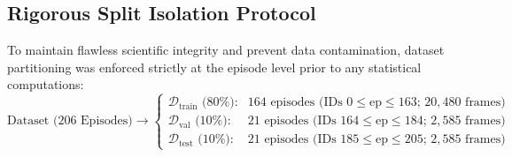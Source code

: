 \documentclass[11pt,a4paper]{article}
\begin{document}
\subsection{Rigorous Split Isolation Protocol}
To maintain flawless scientific integrity and prevent data contamination, dataset partitioning was enforced strictly at the episode level prior to any statistical computations:
\begin{equation}
    \text{Dataset (206 Episodes)} \longrightarrow \begin{cases} 
    \mathcal{D}_{\text{train}} \text{ (80\%):} & 164 \text{ episodes (IDs } 0 \le \text{ep} \le 163 \text{; } 20,480 \text{ frames)} \\ 
    \mathcal{D}_{\text{val}} \text{ (10\%):} & 21 \text{ episodes (IDs } 164 \le \text{ep} \le 184 \text{; } 2,585 \text{ frames)} \\ 
    \mathcal{D}_{\text{test}} \text{ (10\%):} & 21 \text{ episodes (IDs } 185 \le \text{ep} \le 205 \text{; } 2,585 \text{ frames)} 
    \end{cases}
\end{equation}
\end{document}
